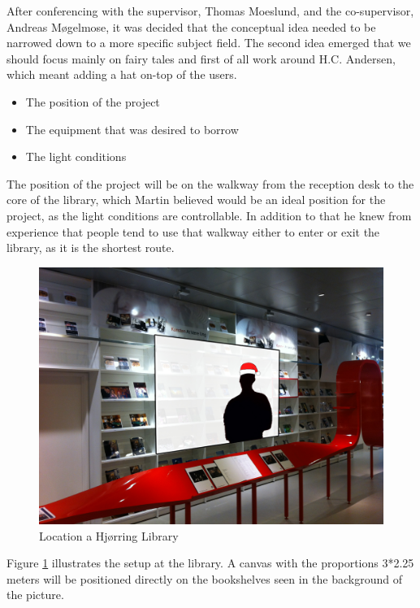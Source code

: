 After conferencing with the supervisor, Thomas Moeslund, and the co-supervisor, Andreas Møgelmose, it was decided that the conceptual idea needed to be narrowed down to a more specific subject field. The second idea emerged that we should focus mainly on fairy tales and first of all work around H.C. Andersen, which meant adding a hat on-top of the users.


\begin{itemize}
\item The position of the project
\item The equipment that was desired to borrow
\item The light conditions
\end{itemize}

The position of the project will be on the walkway from the reception desk to the core of the library, which Martin believed would be an ideal position for the project, as the light conditions are controllable. In addition to that he knew from experience that people tend to use that walkway either to enter or exit the library, as it is the shortest route.

\begin{figure}[htbp]
\centering
\includegraphics[width=1.00\textwidth]{Pictures/HjoerringLibrary/LocationJohannesHat.jpg}
\caption{Location a Hjørring Library}
\label{fig:concept_art}
\end{figure}
Figure \ref{fig:concept_art} illustrates the setup at the library. A canvas with the proportions 3*2.25 meters will be positioned directly on the bookshelves seen in the background of the picture.

